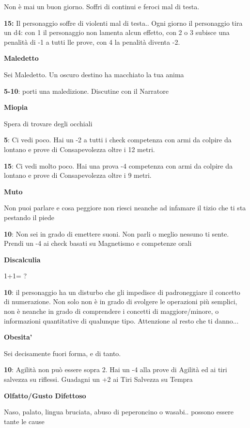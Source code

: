 \documentclass[a4paper,11pt,twoside,openany]{book}
\begin{document}
Non è mai un buon giorno. Soffri di continui e feroci mal di testa.

\textbf{15:} Il personaggio soffre di violenti mal di testa.. Ogni giorno il personaggio tira un d4: con 1 il personaggio non lamenta alcun effetto, con 2 o 3 subisce una penalità di -1 a tutti lle prove, con 4 la penalità diventa -2.

\textbf{Maledetto}

Sei Maledetto. Un oscuro destino ha macchiato la tua anima

\textbf{5-10}: porti una maledizione. Discutine con il Narratore

\textbf{Miopia}

Spera di trovare degli occhiali

\textbf{5}: Ci vedi poco. Hai un -2 a tutti i check competenza con armi da colpire da lontano e prove di Consapevolezza oltre i 12 metri.

\textbf{15}: Ci vedi molto poco. Hai una prova -4 competenza con armi da colpire da lontano e prove di Consapevolezza oltre i 9 metri.

\textbf{Muto}

Non puoi parlare e cosa peggiore non riesci neanche ad infamare il
tizio che ti sta pestando il piede

\textbf{10}: Non sei in grado di emettere suoni. Non parli o meglio nessuno ti sente. Prendi un -4 ai check basati su Magnetismo e competenze orali

\textbf{Discalculia}

1+1= ?

\textbf{10}: il personaggio ha un disturbo che gli impedisce di padroneggiare il concetto di numerazione. Non solo non è in grado di svolgere le operazioni più semplici, non è neanche in grado di comprendere i concetti di maggiore/minore, o informazioni quantitative di qualunque tipo.
Attenzione al resto che ti danno...

\textbf{Obesita'}

Sei decisamente fuori forma, e di tanto.

\textbf{10}: Agilità non può essere sopra 2. Hai un -4 alla prove di Agilità ed ai tiri salvezza su riflessi. Guadagni un +2 ai Tiri Salvezza su Tempra

\textbf{Olfatto/Gusto Difettoso}

Naso, palato, lingua bruciata, abuso di peperoncino o wasabi.. possono essere tante le cause
\end{document}
